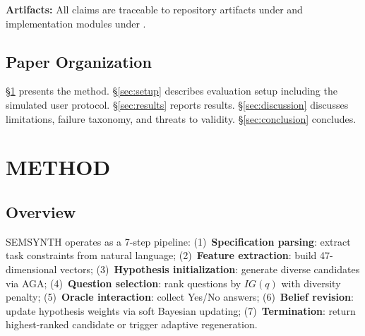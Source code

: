 \documentclass[10pt,conference]{IEEEtran}
\begin{document}
\textbf{Artifacts:} All claims are traceable to repository artifacts under  and implementation modules under .

\subsection{Paper Organization}
\S\ref{sec:method} presents the method. \S\ref{sec:setup} describes evaluation setup including the simulated user protocol. \S\ref{sec:results} reports results. \S\ref{sec:discussion} discusses limitations, failure taxonomy, and threats to validity. \S\ref{sec:conclusion} concludes.

\section{METHOD}\label{sec:method}

\subsection{Overview}
SEMSYNTH operates as a 7-step pipeline: (1)~\textbf{Specification parsing}: extract task constraints from natural language; (2)~\textbf{Feature extraction}: build 47-dimensional vectors; (3)~\textbf{Hypothesis initialization}: generate diverse candidates via AGA; (4)~\textbf{Question selection}: rank questions by $IG(q)$ with diversity penalty; (5)~\textbf{Oracle interaction}: collect Yes/No answers; (6)~\textbf{Belief revision}: update hypothesis weights via soft Bayesian updating; (7)~\textbf{Termination}: return highest-ranked candidate or trigger adaptive regeneration.
\end{document}
